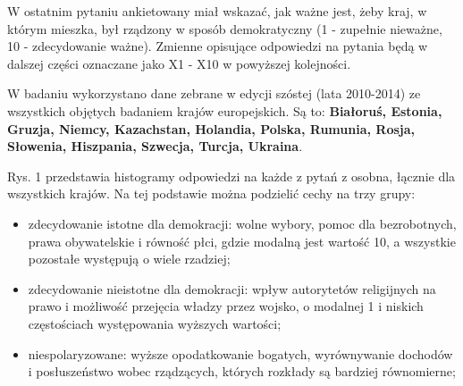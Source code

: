 \documentclass[12pt]{article}
\providecommand{\tightlist}{%
  \setlength{\itemsep}{0pt}\setlength{\parskip}{0pt}}
\begin{document}
W ostatnim pytaniu ankietowany miał wskazać, jak ważne jest, żeby kraj, w którym mieszka, był rządzony w sposób demokratyczny (1 - zupełnie nieważne, 10 - zdecydowanie ważne). Zmienne opisujące odpowiedzi na pytania będą w dalszej części oznaczane jako X1 - X10 w powyższej kolejności.

W badaniu wykorzystano dane zebrane w edycji szóstej (lata 2010-2014) ze wszystkich objętych badaniem krajów europejskich. Są to: \textbf{Białoruś, Estonia, Gruzja, Niemcy, Kazachstan, Holandia, Polska, Rumunia, Rosja, Słowenia, Hiszpania, Szwecja, Turcja, Ukraina}.

Rys. 1 przedstawia histogramy odpowiedzi na każde z pytań z osobna, łącznie dla wszystkich krajów. Na tej podstawie można podzielić cechy na trzy grupy:

\begin{itemize}
\tightlist
\item
  zdecydowanie istotne dla demokracji: wolne wybory, pomoc dla bezrobotnych, prawa obywatelskie i równość płci, gdzie modalną jest wartość 10, a wszystkie pozostałe występują o wiele rzadziej;
\item
  zdecydowanie nieistotne dla demokracji: wpływ autorytetów religijnych na prawo i możliwość przejęcia władzy przez wojsko, o modalnej 1 i niskich częstościach występowania wyższych wartości;
\item
  niespolaryzowane: wyższe opodatkowanie bogatych, wyrównywanie dochodów i posłuszeństwo wobec rządzących, których rozkłady są bardziej równomierne;
\end{itemize}
\end{document}
